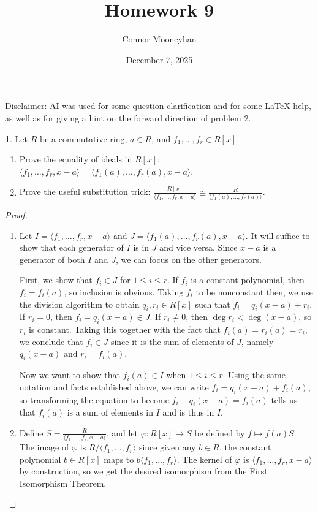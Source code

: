 \documentclass[12pt]{article}
\title{Homework 9}
\author{Connor Mooneyhan}
\date{December 7, 2025}
\theoremstyle{definition}
\newtheorem{ex}{}
\begin{document}
\maketitle

Disclaimer: AI was used for some question clarification and for some LaTeX help, as well as for giving a hint on the forward direction of problem 2.

\begin{ex}
	Let $R$ be a commutative ring, $a \in R$, and $f_1, \dots, f_r \in R[x]$.
	\begin{enumerate}[label=(\alph*)]
		\item Prove the equality of ideals in $R[x]$: $\langle f_1, \dots, f_r, x-a\rangle = \langle f_1(a), \dots, f_r(a), x - a \rangle$.
		\item Prove the useful substitution trick: $\frac{R[x]}{\langle f_1, \dots, f_r, x-a\rangle} \cong \frac{R}{\langle f_1(a), \dots, f_r(a)\rangle}$.
	\end{enumerate}
\end{ex}
\begin{proof}\
	\begin{enumerate}[label=(\alph*)]
		\item Let $I = \langle f_1, \dots, f_r, x-a \rangle$ and $J = \langle f_1(a), \dots, f_r(a), x-a \rangle$.
		      It will suffice to show that each generator of $I$ is in $J$ and vice versa.
		      Since $x-a$ is a generator of both $I$ and $J$, we can focus on the other generators.

		      First, we show that $f_i  \in J$ for $1 \leq i \leq r$.
		      If $f_i$ is a constant polynomial, then $f_i = f_i(a)$, so inclusion is obvious.
		      Taking $f_i$ to be nonconstant then, we use the division algorithm to obtain $q_i, r_i \in R[x]$ such that $f_i = q_i(x-a) + r_i$.
		      If $r_i = 0$, then $f_i = q_i(x-a) \in J$.
		      If $r_i \neq 0$, then $\deg r_i < \deg (x-a)$, so $r_i$ is constant.
		      Taking this together with the fact that $f_i(a) = r_i(a) = r_i$, we conclude that $f_i \in J$ since it is the sum of elements of $J$, namely $q_i(x-a)$ and $r_i = f_i(a)$.

		      Now we want to show that $f_i(a) \in I$ when $1 \leq i \leq r$.
		      Using the same notation and facts established above, we can write $f_i = q_i(x-a) + f_i(a)$, so transforming the equation to become $f_i - q_i(x-a) = f_i(a)$ tells us that $f_i(a)$ is a sum of elements in $I$ and is thus in $I$.
		\item Define $S = \frac{R}{\langle f_1, \dots, f_r, x-a\rangle}$, and let $\varphi : R[x] \to S$ be defined by $f \mapsto f(a)S$.
		      The image of $\varphi$ is $R/\langle f_1, \dots, f_r \rangle$ since given any $b \in R$, the constant polynomial $b \in R[x]$ maps to $b\langle f_1, \dots, f_r \rangle$.
		      The kernel of $\varphi$ is $\langle f_1, \dots, f_r, x-a \rangle$ by construction, so we get the desired isomorphism from the First Isomorphism Theorem.
	\end{enumerate}
\end{proof}
\end{document}
